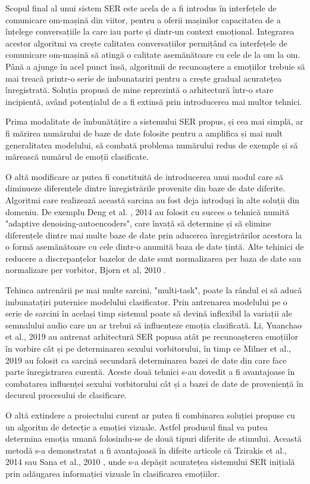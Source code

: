 \documentclass[a4paper,12pt]{book}
\begin{document}
		Scopul final al unui sistem SER este acela de a fi introdus în interfețele de comunicare om-mașină din viitor, pentru a oferii mașinilor capacitatea de a înțelege conversațiile la care iau parte și dintr-un context emoțional. Integrarea acestor algoritmi va crește calitatea conversațiilor permițând ca interfețele de comunicare om-mașină să atingă o calitate asemănătoare cu cele de la om la om. Până a ajunge în acel punct însă, algoritmii de recunoaștere a emoțiilor trebuie să mai treacă printr-o serie de imbunatariri pentru a crește gradual acuratețea înregistrată. Soluția propusă de mine reprezintă o arhitectură într-o stare incipientă, având potențialul de a fi extinsă prin introducerea mai multor tehnici. \par
		
		Prima modalitate de îmbunătățire a sistemului SER propus, și cea mai simplă, ar fi mărirea numărului de baze de date folosite pentru a amplifica și mai mult generalitatea modelului, să combată problema numărului redus de exemple și să mărească numărul de emoții clasificate. \par 
		O altă modificare ar putea fi constituită de introducerea unui modul care să diminueze diferențele dintre înregistrările provenite din baze de date diferite. Algoritmi care realizează această sarcina au fost deja introduși în alte soluții din domeniu. De exemplu Deng et al. , 2014 \cite{imbun1} au folosit cu succes o tehnică numită "adaptive denoising-autoencoders", care învață să determine și să elimine diferențele dintre mai multe baze de date prin aducerea înregistrărilor acestora la o formă asemănătoare cu cele dintr-o anumită baza de date țintă. Alte tehinici de reducere a discrepanțelor bazelor de date sunt normalizarea per baza de date sau normalizare per vorbitor, Bjorn et al, 2010 \cite{spnorm}. \par
		Tehinca antrenării pe mai multe sarcini, "multi-task", poate la rândul ei să aducă imbunatațiri puternice modelului clasificator. Prin antrenarea modelului pe o serie de sarcini în același timp sistemul poate să devină inflexibil la variații ale semnalului audio care nu ar trebui să influențeze emoția clasificată. Li, Yuanchao et al., 2019 \cite{yuan} au antrenat arhitectură SER popusa atât pe recunoașterea emoțiilor în vorbire cât și pe determinarea sexului vorbitorului, în timp ce Milner et al., 2019 \cite{multi-domain} au folosit ca sarcină secundară determinarea bazei de date din care face parte înregistrarea curentă. Aceste două tehnici s-au dovedit a fi avantajoase în combatarea influenței sexului vorbitorului cât și a bazei de date de proveniență în decursul procesului de clasificare.\par 
		O altă extindere a proiectului curent ar putea fi combinarea soluției propuse cu un algoritm de detecție a emoției vizuale. Astfel produsul final va putea determina emoția umană folosindu-se de două tipuri diferite de stimului. Această metodă s-a demonstratat a fi avantajoasă în difeite articole că Tzirakis et al., 2014 \cite{tzir} sau Sana et al., 2010 \cite{imbun3}, unde s-a depășit acuratețea sistemului SER inițială prin adăugarea informației vizuale în clasificarea emoțiilor. \par
		
\end{document}
